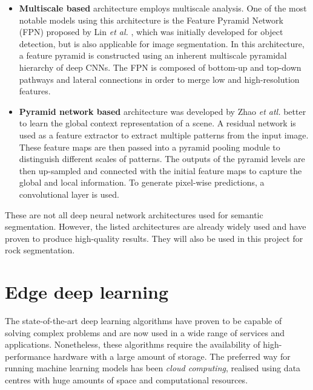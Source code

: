\documentclass[a4paper,twoside,12pt]{book}
\begin{document}
\begin{itemize}
    \item \textbf{Multiscale based} architecture employs multiscale analysis. One of the most notable models using this architecture is the Feature Pyramid Network (FPN) proposed by Lin \textit{et al.} \cite{lin2017feature}, which was initially developed for object detection, but is also applicable for image segmentation. In this architecture, a feature pyramid is constructed using an inherent multiscale pyramidal hierarchy of deep CNNs. The FPN is composed of bottom-up and top-down pathways and lateral connections in order to merge low and high-resolution features.

    \item \textbf{Pyramid network based} architecture was developed by Zhao \textit{et atl.} \cite{zhao2017pyramid} better to learn the global context representation of a scene. A residual network is used as a feature extractor to extract multiple patterns from the input image. These feature maps are then passed into a pyramid pooling module to distinguish different scales of patterns. The outputs of the pyramid levels are then up-sampled and connected with the initial feature maps to capture the global and local information. To generate pixel-wise predictions, a convolutional layer is used.

\end{itemize}


These are not all deep neural network architectures used for semantic segmentation. However, the listed architectures are already widely used and have proven to produce high-quality results. They will also be used in this project for rock segmentation.

\section{Edge deep learning}
\label{sec:chapter2.4}

The state-of-the-art deep learning algorithms have proven to be capable of solving complex problems and are now used in a wide range of services and applications. Nonetheless, these algorithms require the availability of high-performance hardware with a large amount of storage\cite{najafabadi2015deep}. The preferred way for running machine learning models has been \emph{cloud computing}, realised using data centres with huge amounts of space and computational resources.
\end{document}
